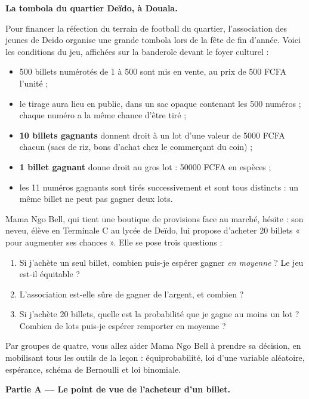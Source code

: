 \documentclass[11pt]{article}
\newcounter{popsec}
\newcounter{popsub}
\newcommand{\courssub}[1]{%
  \stepcounter{popsub}%
  \par\vspace{9pt}\noindent{\popxbold\fontsize{11.5}{13}\selectfont\color{popink}{\color{poporange}\thepopsec.\thepopsub}\hspace{6pt}#1}\par\nopagebreak\vspace{4pt}
}
\begin{document}
\courssub{Situation}

\textbf{La tombola du quartier Deïdo, à Douala.}

Pour financer la réfection du terrain de football du quartier, l'association des jeunes de Deïdo organise une grande tombola lors de la fête de fin d'année. Voici les conditions du jeu, affichées sur la banderole devant le foyer culturel :

\begin{itemize}
\item \num{500} billets numérotés de 1 à 500 sont mis en vente, au prix de \num{500} FCFA l'unité ;
\item le tirage aura lieu en public, dans un sac opaque contenant les \num{500} numéros ; chaque numéro a la même chance d'être tiré ;
\item \textbf{10 billets gagnants} donnent droit à un lot d'une valeur de \num{5000} FCFA chacun (sacs de riz, bons d'achat chez le commerçant du coin) ;
\item \textbf{1 billet gagnant} donne droit au gros lot : \num{50000} FCFA en espèces ;
\item les 11 numéros gagnants sont tirés successivement et sont tous distincts : un même billet ne peut pas gagner deux lots.
\end{itemize}

Mama Ngo Bell, qui tient une boutique de provisions face au marché, hésite : son neveu, élève en Terminale C au lycée de Deïdo, lui propose d'acheter 20 billets « pour augmenter ses chances ». Elle se pose trois questions :

\begin{enumerate}
\item Si j'achète un seul billet, combien puis-je espérer gagner \emph{en moyenne} ? Le jeu est-il équitable ?
\item L'association est-elle sûre de gagner de l'argent, et combien ?
\item Si j'achète 20 billets, quelle est la probabilité que je gagne au moins un lot ? Combien de lots puis-je espérer remporter en moyenne ?
\end{enumerate}

Par groupes de quatre, vous allez aider Mama Ngo Bell à prendre sa décision, en mobilisant tous les outils de la leçon : équiprobabilité, loi d'une variable aléatoire, espérance, schéma de Bernoulli et loi binomiale.

\courssub{Consignes}

\textbf{Partie A — Le point de vue de l'acheteur d'un billet.}
\end{document}
